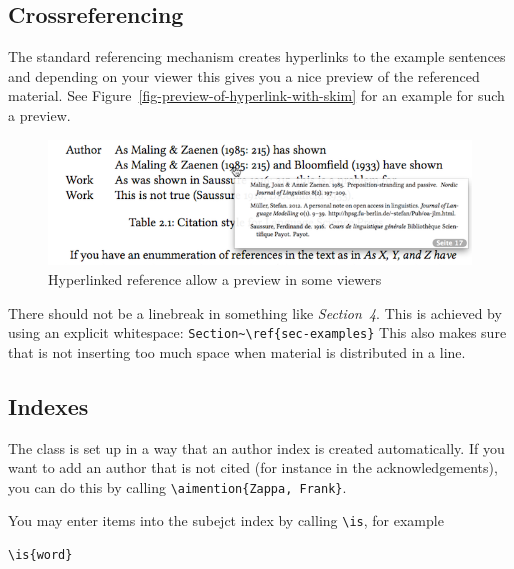 \subsection{Crossreferencing}

The standard referencing mechanism creates hyperlinks to the
example sentences and depending on your viewer this gives you a nice preview of the referenced
material.
See Figure~\vref{fig-preview-of-hyperlink-with-skim} for an example for such a preview.
\begin{figure}[htbp]
\includegraphics[width=\linewidth]{crossref.png}
\caption{\label{fig-preview-of-hyperlink-with-skim}Hyperlinked reference allow a preview in some viewers}
\end{figure}


There should not be a linebreak in something like \emph{Section~4}. This is achieved by using an explicit
whitespace: \verb+Section~\ref{sec-examples}+ This also makes sure that \latex is not inserting too
much space when material is distributed in a line.

\subsection{Indexes}

The \lsp class is set up in a way that an author index is created automatically. If you want to add
an author that is not cited (for instance in the acknowledgements), you can do this by calling
\verb+\aimention{Zappa, Frank}+.

You may enter items into the subejct index by calling \verb+\is+, for example 
\begin{verbatim}
\is{word}
\end{verbatim}

